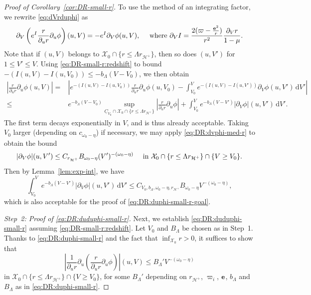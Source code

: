 \documentclass[10pt, reqno]{amsart}
\theoremstyle{definition}
\theoremstyle{remark}
\theoremstyle{conjecture}
\numberwithin{equation}{section}
\newcommand{\abs}[1]{\vert#1\vert}
\newcommand{\set}[1]{\{#1\}}
\newcommand{\ud}{\mathrm{d}}
\newcommand{\rd}{\partial}
\newcommand{\0}{\emptyset}
\newcommand{\Lmb}{\Lambda}
\newcommand{\omg}{\omega}
\newcommand{\bfe}{{\bf e}}
\newcommand{\calH}{\mathcal H}
\newcommand{\calX}{\mathcal X}
\newcommand{\uC}{\underline{C}}
\newcommand{\EH}{\calH^{+}}
\newcommand{\pfstep}[1]{\vspace{.5em} {\it \noindent #1.}}
\newcommand{\e}{\bfe}							%
\newcommand{\Abs}[1]{\left\vert #1 \right\vert}
\begin{document}
\begin{proof}[Proof of Corollary~\ref{cor:DR-small-r}]
To use the method of an integrating factor, we rewrite \eqref{eq:dVrduphi} as
\begin{equation*}
	\rd_{V}\left( e^{I} \frac{r}{\rd_{u} r} \rd_{u} \phi \right)(u,V) = - e^{I} \rd_{V} \phi(u, V) , \quad \hbox{ where } \rd_{V} I = \frac{2 (\varpi-\frac{\e^{2}}{r})}{r^{2}} \frac{\rd_{V} r}{1-\mu}.
\end{equation*}
Note that if $(u, V)$ belongs to $\calX_{0} \cap \set{r \leq \Lmb r_{\EH}}$, then so does $(u, V')$ for $1 \leq V' \leq V$. Using \eqref{eq:DR-small-r:redshift} to bound $- (I(u, V) - I(u, V_{0})) \leq - b_{\Lmb} (V - V_{0})$, we then obtain
\begin{align*}
	\Abs{\frac{r}{\rd_{u} r} \rd_{u} \phi(u, V)}
	= & \Abs{e^{-(I(u, V) - I(u, V_{0}))} \frac{r}{\rd_{u} r} \rd_{u} \phi(u, V_{0}) - \int_{V_{0}}^{V} e^{- (I(u, V) - I(u, V'))} \rd_{V} \phi(u, V') \, \ud V'} \\
	\leq & e^{-b_{\Lmb}(V - V_{0})} \sup_{\uC_{V_{0}} \cap \calX_{0} \cap \set{r \leq \Lmb r_{\EH}}} \Abs{\frac{r}{\rd_{u} r} \rd_{u} \phi}
		 + \int_{V_{0}}^{V} e^{- b_{\Lmb}(V - V')} \abs{\rd_{V} \phi}(u, V') \, \ud V' .
\end{align*}
The first term decays exponentially in $V$, and is thus already acceptable. Taking $V_{0}$ larger (depending on $c_{\omg_{0} - \eta}$) if necessary, we may apply \eqref{eq:DR:dvphi-med-r} to obtain the bound 
\begin{equation} \label{eq:DR-small-r:dvphi}
\abs{\rd_{V} \phi}(u, V') \leq C_{r_{\EH}} B_{\omg_{0}-\eta} (V')^{-(\omg_{0} - \eta)}  \quad \hbox{ in } \calX_{0} \cap \set{r \leq \Lmb r_{\EH}} \cap \set{V \geq V_{0}} .
\end{equation}
Then by Lemma~\ref{lem:exp-int}, we have
\begin{equation*}
\int_{V_{0}}^{V} e^{- b_{\Lmb}(V - V')} \abs{\rd_{V} \phi}(u, V') \, \ud V' \leq C_{V_{0}, b_{\Lmb}, \omg_{0}-\eta, r_{\EH}} B_{\omg_{0} - \eta} V^{-(\omg_{0} - \eta)},
\end{equation*}
which is also acceptable for the proof of \eqref{eq:DR:duphi-small-r-goal}.

\pfstep{Step~2: Proof of \eqref{eq:DR:duduphi-small-r}}
Next, we establish \eqref{eq:DR:duduphi-small-r} assuming \eqref{eq:DR-small-r:redshift}. 
Let $V_{0}$ and $B_{\Lmb}$ be chosen as in Step~1.
Thanks to \eqref{eq:DR:duphi-small-r} and the fact that $\inf_{\calX_{0}} r > 0$, it suffices to show that 
\begin{equation} \label{eq:DR:duduphi-small-r-goal}
	\Abs{\frac{1}{\rd_{u} r} \rd_{u} \left( \frac{r}{\rd_{u} r} \rd_{u} \phi\right)} (u, V)
	\leq B_{\Lmb}' V^{-(\omg_{0} - \eta)}
\end{equation}
in $\calX_{0} \cap \set{r \leq \Lmb r_{\EH}} \cap \set{V \geq V_{0}}$, for some $B_{\Lmb}'$ depending on $r_{\EH}$, $\varpi_{i}$, $\e$, $b_{\Lmb}$ and $B_{\Lmb}$ as in \eqref{eq:DR:duphi-small-r}.


\end{proof}
\end{document}
